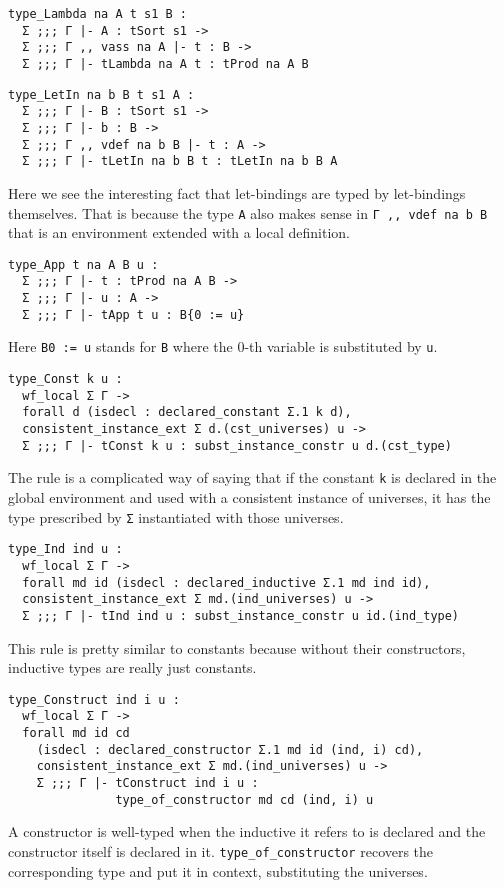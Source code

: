 \begin{verbatim}
type_Lambda na A t s1 B :
  Σ ;;; Γ |- A : tSort s1 ->
  Σ ;;; Γ ,, vass na A |- t : B ->
  Σ ;;; Γ |- tLambda na A t : tProd na A B
\end{verbatim}

\begin{verbatim}
type_LetIn na b B t s1 A :
  Σ ;;; Γ |- B : tSort s1 ->
  Σ ;;; Γ |- b : B ->
  Σ ;;; Γ ,, vdef na b B |- t : A ->
  Σ ;;; Γ |- tLetIn na b B t : tLetIn na b B A
\end{verbatim}
Here we see the interesting fact that let-bindings are typed by let-bindings
themselves. That is because the type \texttt{A} also makes sense in
\texttt{Γ ,, vdef na b B} that is an environment extended with a local
definition.

\begin{verbatim}
type_App t na A B u :
  Σ ;;; Γ |- t : tProd na A B ->
  Σ ;;; Γ |- u : A ->
  Σ ;;; Γ |- tApp t u : B{0 := u}
\end{verbatim}
Here \texttt{B{0 := u}} stands for \texttt{B} where the
\(0\)-th variable is substituted by \texttt{u}.

\begin{verbatim}
type_Const k u :
  wf_local Σ Γ ->
  forall d (isdecl : declared_constant Σ.1 k d),
  consistent_instance_ext Σ d.(cst_universes) u ->
  Σ ;;; Γ |- tConst k u : subst_instance_constr u d.(cst_type)
\end{verbatim}
The rule is a complicated way of saying that if the constant
\texttt{k} is declared in the global environment and used with
a consistent instance of universes, it has the type prescribed by
\texttt{Σ} instantiated with those universes.

\begin{verbatim}
type_Ind ind u :
  wf_local Σ Γ ->
  forall md id (isdecl : declared_inductive Σ.1 md ind id),
  consistent_instance_ext Σ md.(ind_universes) u ->
  Σ ;;; Γ |- tInd ind u : subst_instance_constr u id.(ind_type)
\end{verbatim}
This rule is pretty similar to constants because without their constructors,
inductive types are really just constants.

\begin{verbatim}
type_Construct ind i u :
  wf_local Σ Γ ->
  forall md id cd
    (isdecl : declared_constructor Σ.1 md id (ind, i) cd),
    consistent_instance_ext Σ md.(ind_universes) u ->
    Σ ;;; Γ |- tConstruct ind i u :
               type_of_constructor md cd (ind, i) u
\end{verbatim}
A constructor is well-typed when the inductive it refers to is declared and
the constructor itself is declared in it.
\texttt{type_of_constructor} recovers the corresponding type and put it
in context, substituting the universes.


